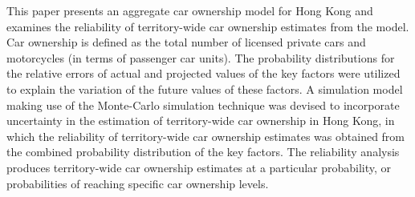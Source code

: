 This paper presents an aggregate car ownership model for Hong Kong and examines the reliability of territory-wide car ownership estimates from the model. Car ownership is defined as the total number of licensed private cars and motorcycles (in terms of passenger car units). The probability distributions for the relative errors of actual and projected values of the key factors were utilized to explain the variation of the future values of these factors. A simulation model making use of the Monte-Carlo simulation technique was devised to incorporate uncertainty in the estimation of territory-wide car ownership in Hong Kong, in which the reliability of territory-wide car ownership estimates was obtained from the combined probability distribution of the key factors. The reliability analysis produces territory-wide car ownership estimates at a particular probability, or probabilities of reaching specific car ownership levels.
